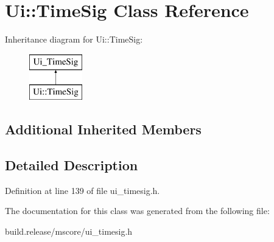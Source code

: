 \hypertarget{class_ui_1_1_time_sig}{}\section{Ui\+:\+:Time\+Sig Class Reference}
\label{class_ui_1_1_time_sig}
Inheritance diagram for Ui\+:\+:Time\+Sig\+:\begin{figure}[H]
\begin{center}
\leavevmode
\includegraphics[height=2.000000cm]{class_ui_1_1_time_sig}
\end{center}
\end{figure}
\subsection*{Additional Inherited Members}


\subsection{Detailed Description}


Definition at line 139 of file ui\+\_\+timesig.\+h.



The documentation for this class was generated from the following file\+:\begin{DoxyCompactItemize}
\item 
build.\+release/mscore/ui\+\_\+timesig.\+h\end{DoxyCompactItemize}
